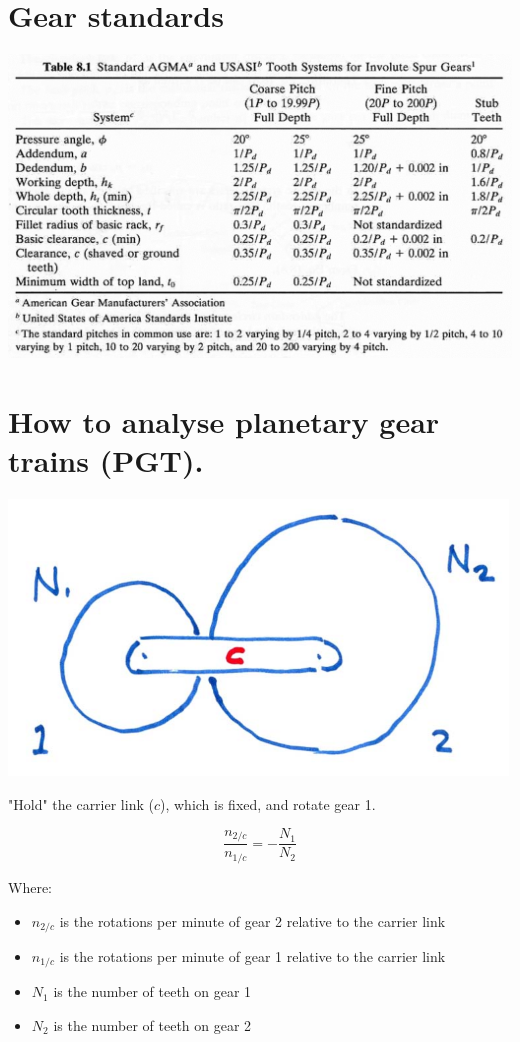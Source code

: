 \documentclass[11pt]{article}
\begin{document}
\section{Gear standards}
\label{sec:org77259cb}
\begin{center}
\includegraphics[width=.9\linewidth]{./images/gear-standards-table.png}
\end{center}

 \newpage
\section{How to analyse planetary gear trains (PGT).}
\label{sec:org3793ed5}
\begin{center}
\includegraphics[width=.9\linewidth]{./images/planetary-gear-train-simplified-diagram.png}
\end{center}
"Hold" the carrier link (\(c\)), which is fixed, and rotate gear 1.

\[\frac{n_{2/c}}{n_{1/c}} = - \frac{N_1}{N_2}\]

Where:
\begin{itemize}
\item \(n_{2/c}\) is the rotations per minute of gear 2 relative to the carrier link
\item \(n_{1/c}\) is the rotations per minute of gear 1 relative to the carrier link
\item \(N_1\) is the number of teeth on gear 1
\item \(N_2\) is the number of teeth on gear 2
\end{itemize}
\end{document}
